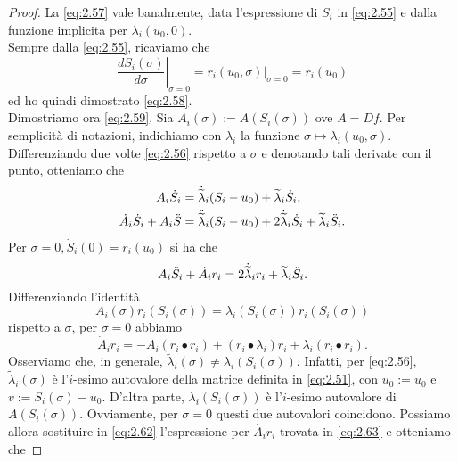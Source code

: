 \begin{proof}
    La \eqref{eq:2.57} vale banalmente, data l'espressione di $S_{i}$ in \eqref{eq:2.55} e dalla funzione implicita per $\lambda_{i}(u_{0},0)$.\\
    Sempre dalla \eqref{eq:2.55}, ricaviamo che
    \begin{equation*}
        \left.\frac{dS_{i}(\sigma)}{d\sigma}\right|_{\sigma = 0} = \left. r_{i}(u_{0},\sigma)\right|_{\sigma =0} = r_{i}(u_{0})
    \end{equation*}
    ed ho quindi dimostrato \eqref{eq:2.58}.\\
    Dimostriamo ora \eqref{eq:2.59}. Sia $A_{i}(\sigma):=A(S_{i}(\sigma))$ ove $A = Df$.
    Per semplicità di notazioni, indichiamo con $\widetilde{\lambda}_{i}$ la funzione $\sigma\mapsto\lambda_{i}(u_{0},\sigma)$.\\
    Differenziando due volte \eqref{eq:2.56} rispetto a $\sigma$ e denotando tali derivate con il punto, otteniamo che
    \begin{align}\label{eq:2.61}
        A_{i}\dot{S}_{i}&=\dot{\widetilde{\lambda}}_{i}(S_{i}-u_{0})+\widetilde{\lambda}_{i}\dot{S}_{i},\nonumber\\
        \dot{A}_{i}\dot{S}_{i}+A_{i}\Ddot{S}&=\Ddot{\widetilde{\lambda}}_{i}(S_{i}-u_{0})+2\dot{\widetilde{\lambda}}_{i}\dot{S}_{i}+\widetilde{\lambda}_{i}\Ddot{S}_{i}.
    \end{align}
    Per $\sigma =0, \dot{S}_{i}(0)=r_{i}(u_{0})$ si ha che
    \begin{equation}\label{eq:2.62}
    A_{i}\Ddot{S}_{i}+\dot{A}_{i}r_{i}=2\dot{\widetilde{\lambda}}_{i}r_{i}+\widetilde{\lambda}_{i}\Ddot{S}_{i}.
    \end{equation}
    Differenziando l'identità
    \begin{equation*}
        A_{i}(\sigma)r_{i}(S_{i}(\sigma))=\lambda_{i}(S_{i}(\sigma))r_{i}(S_{i}(\sigma))
    \end{equation*}
    rispetto a $\sigma$, per $\sigma =0$ abbiamo
    \begin{equation}\label{eq:2.63}
        \dot{A}_{i}r_{i}=-A_{i}(r_{i}\bullet r_{i})+(r_{i}\bullet\lambda_{i})r_{i}+\lambda_{i}(r_{i}\bullet r_{i}).
    \end{equation}
    Osserviamo che, in generale, $\widetilde{\lambda}_{i}(\sigma)\neq\lambda_{i}(S_{i}(\sigma))$. Infatti, per \eqref{eq:2.56}, $\widetilde{\lambda}_{i}(\sigma)$ è l'$i$-esimo autovalore della matrice definita in \eqref{eq:2.51}, con $u_{0}:=u_{0}$ e $v:=S_{i}(\sigma)-u_{0}$. D'altra parte, $\lambda_{i}(S_{i}(\sigma))$ è l'$i$-esimo autovalore di $A(S_{i}(\sigma))$. Ovviamente, per $\sigma =0$ questi due autovalori coincidono. Possiamo allora sostituire in \eqref{eq:2.62} l'espressione per $\dot{A_{i}}r_{i}$ trovata in \eqref{eq:2.63} e otteniamo che

\end{proof}
